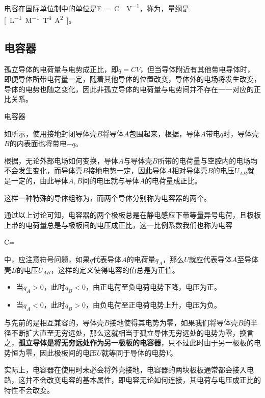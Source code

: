 电容在国际单位制中的单位是\si{F=C\cdot V^{-1}}，称为，量纲是\si{[L^{-1}M^{-1}T^4A^2]}。

\subsection{电容器}
孤立导体的电荷量与电势成正比，即$q=CV$，但当导体附近有其他带电导体时，即便导体所带电荷量一定，随着其他导体的位置改变，导体外的电场将发生改变，导体的电势也随之变化，因此非孤立导体的电荷量与电势间并不存在一一对应的正比关系。\vspace{5pt}
\begin{Figure}{电容器}
\end{Figure}
如所示，使用接地封闭导体壳$B$将导体$A$包围起来，根据，导体$A$带电$q$时，导体壳$B$的内表面也将带电$-q$。

根据，无论外部电场如何变换，导体$A$与导体壳$B$所带的电荷量与空腔内的电场均不会发生变化，而导体壳$B$接地电势一定，因此导体$A$相对导体壳$B$的电压$U_{AB}$就是一定的，由此导体$A,B$间的电压就与导体$A$的电荷量成正比。

这样一种特殊的导体组称为，而两个导体分别称为电容器的两个。

通过以上讨论可知，电容器的两个极板总是在静电感应下带等量异号电荷，且极板上带的电荷量总是与极板间的电压成正比，这一比例系数我们也称为电容
\begin{BoxDefinition}[电容]
    C=
\end{BoxDefinition}
中，应注意符号问题，如果$q$代表导体$A$的电荷量$q_A$，那么$U$就应代表导体$A$至导体壳$B$的电压$U_{AB}$，这样的定义使得电容的值总是为正值。
\begin{itemize}
    \item 当$q_A>0$，此时$q_B<0$，由正电荷至负电荷电势下降，电压为正。
    \item 当$q_A<0$，此时$q_B>0$，由负电荷至正电荷电势上升，电压为负。
\end{itemize}
与先前的是相互兼容的，导体壳$B$接地使得其电势为零，如果我们将导体壳$B$的半径不断扩大直至无穷远处，那么这就相当于孤立导体无穷远处的电势为零，换言之，\textbf{孤立导体是将无穷远处作为另一极板的电容器}，只不过此时由于另一极板的电势恒为零，因此极板间的电压$U$就等同于导体的电势$V$。

实际上，电容器在使用时未必会将外壳接地，电容器的两块极板通常都会接入电路，这并不会改变电容的基本属性，即电容无论如何连接，其电荷与电压成正比的特性不会改变。

